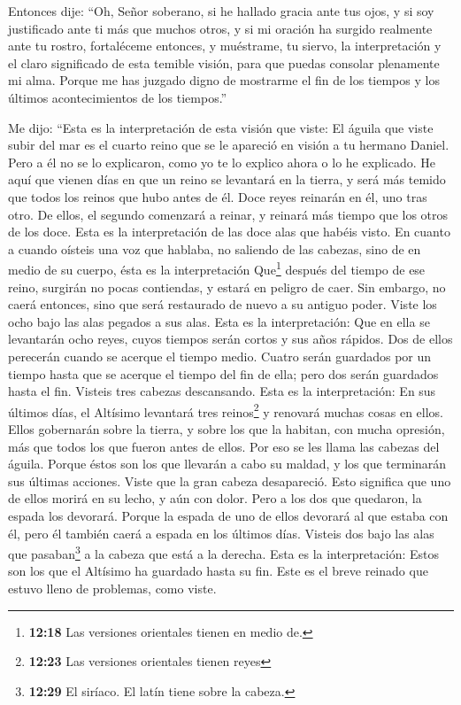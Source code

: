  Entonces dije: ``Oh, Señor soberano, si he hallado gracia
ante tus ojos, y si soy justificado ante ti más que muchos otros, y si
mi oración ha surgido realmente ante tu rostro, 
fortaléceme entonces, y muéstrame, tu siervo, la interpretación y el
claro significado de esta temible visión, para que puedas consolar
plenamente mi alma.  Porque me has juzgado digno de
mostrarme el fin de los tiempos y los últimos acontecimientos de los
tiempos.''

 Me dijo: ``Esta es la interpretación de esta visión que
viste:  El águila que viste subir del mar es el cuarto
reino que se le apareció en visión a tu hermano Daniel. 
Pero a él no se lo explicaron, como yo te lo explico ahora o lo he
explicado.  He aquí que vienen días en que un reino se
levantará en la tierra, y será más temido que todos los reinos que hubo
antes de él.  Doce reyes reinarán en él, uno tras otro.
 De ellos, el segundo comenzará a reinar, y reinará más
tiempo que los otros de los doce.  Esta es la
interpretación de las doce alas que habéis visto.  En
cuanto a cuando oísteis una voz que hablaba, no saliendo de las cabezas,
sino de en medio de su cuerpo, ésta es la interpretación 
Que\footnote{\textbf{12:18} Las versiones orientales tienen en medio de.}
después del tiempo de ese reino, surgirán no pocas contiendas, y estará
en peligro de caer. Sin embargo, no caerá entonces, sino que será
restaurado de nuevo a su antiguo poder.  Viste los ocho
bajo las alas pegados a sus alas. Esta es la interpretación:
 Que en ella se levantarán ocho reyes, cuyos tiempos
serán cortos y sus años rápidos.  Dos de ellos perecerán
cuando se acerque el tiempo medio. Cuatro serán guardados por un tiempo
hasta que se acerque el tiempo del fin de ella; pero dos serán guardados
hasta el fin.  Visteis tres cabezas descansando. Esta es
la interpretación:  En sus últimos días, el Altísimo
levantará tres reinos\footnote{\textbf{12:23} Las versiones orientales
  tienen reyes} y renovará muchas cosas en ellos. Ellos gobernarán sobre
la tierra,  y sobre los que la habitan, con mucha
opresión, más que todos los que fueron antes de ellos. Por eso se les
llama las cabezas del águila.  Porque éstos son los que
llevarán a cabo su maldad, y los que terminarán sus últimas acciones.
 Viste que la gran cabeza desapareció. Esto significa que
uno de ellos morirá en su lecho, y aún con dolor.  Pero a
los dos que quedaron, la espada los devorará.  Porque la
espada de uno de ellos devorará al que estaba con él, pero él también
caerá a espada en los últimos días.  Visteis dos bajo las
alas que pasaban\footnote{\textbf{12:29} El siríaco. El latín tiene
  sobre la cabeza.} a la cabeza que está a la derecha. 
Esta es la interpretación: Estos son los que el Altísimo ha guardado
hasta su fin. Este es el breve reinado que estuvo lleno de problemas,
como viste.

